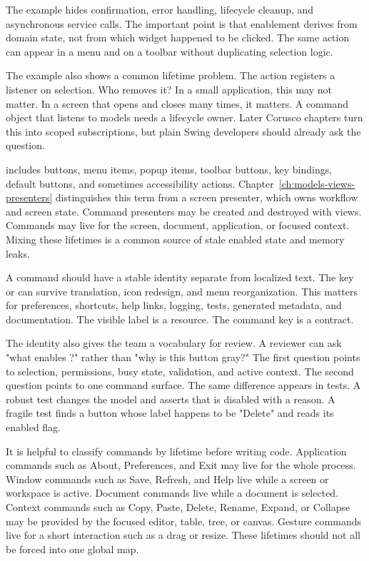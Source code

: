 The example hides confirmation, error handling, lifecycle cleanup, and asynchronous service calls. The important point is that enablement derives from domain state, not from which widget happened to be clicked. The same action can appear in a menu and on a toolbar without duplicating selection logic.

The example also shows a common lifetime problem. The action registers a listener on selection. Who removes it? In a small application, this may not matter. In a screen that opens and closes many times, it matters. A command object that listens to models needs a lifecycle owner. Later Corusco chapters turn this into scoped subscriptions, but plain Swing developers should already ask the question.

 includes buttons, menu items, popup items, toolbar buttons, key bindings, default buttons, and sometimes accessibility actions. Chapter~\ref{ch:models-views-presenters} distinguishes this term from a screen presenter, which owns workflow and screen state. Command presenters may be created and destroyed with views. Commands may live for the screen, document, application, or focused context. Mixing these lifetimes is a common source of stale enabled state and memory leaks.

A command should have a stable identity separate from localized text. The key  or  can survive translation, icon redesign, and menu reorganization. This matters for preferences, shortcuts, help links, logging, tests, generated metadata, and documentation. The visible label is a resource. The command key is a contract.

The identity also gives the team a vocabulary for review. A reviewer can ask
"what enables ?" rather than "why is this button gray?"
The first question points to selection, permissions, busy state, validation,
and active context. The second question points to one command surface. The same
difference appears in tests. A robust test changes the model and asserts that
 is disabled with a reason. A fragile test finds a button
whose label happens to be "Delete" and reads its enabled flag.

It is helpful to classify commands by lifetime before writing code. Application
commands such as About, Preferences, and Exit may live for the whole process.
Window commands such as Save, Refresh, and Help live while a screen or
workspace is active. Document commands live while a document is selected.
Context commands such as Copy, Paste, Delete, Rename, Expand, or Collapse may
be provided by the focused editor, table, tree, or canvas. Gesture commands
live for a short interaction such as a drag or resize. These lifetimes should
not all be forced into one global map.

